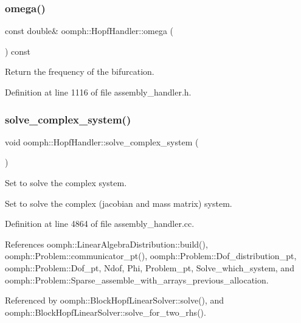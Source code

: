 \subsubsection{\texorpdfstring{omega()}{omega()}}
{\footnotesize\ttfamily const double\& oomph\+::\+Hopf\+Handler\+::omega (\begin{DoxyParamCaption}{ }\end{DoxyParamCaption}) const\hspace{0.3cm}{\ttfamily [inline]}}



Return the frequency of the bifurcation. 



Definition at line 1116 of file assembly\+\_\+handler.\+h.

\mbox{\label{classoomph_1_1HopfHandler_ac7feecfa644ae33b4a4a9fa8d1d993af}} 
\subsubsection{\texorpdfstring{solve\+\_\+complex\+\_\+system()}{solve\_complex\_system()}}
{\footnotesize\ttfamily void oomph\+::\+Hopf\+Handler\+::solve\+\_\+complex\+\_\+system (\begin{DoxyParamCaption}{ }\end{DoxyParamCaption})}



Set to solve the complex system. 

Set to solve the complex (jacobian and mass matrix) system. 

Definition at line 4864 of file assembly\+\_\+handler.\+cc.



References oomph\+::\+Linear\+Algebra\+Distribution\+::build(), oomph\+::\+Problem\+::communicator\+\_\+pt(), oomph\+::\+Problem\+::\+Dof\+\_\+distribution\+\_\+pt, oomph\+::\+Problem\+::\+Dof\+\_\+pt, Ndof, Phi, Problem\+\_\+pt, Solve\+\_\+which\+\_\+system, and oomph\+::\+Problem\+::\+Sparse\+\_\+assemble\+\_\+with\+\_\+arrays\+\_\+previous\+\_\+allocation.



Referenced by oomph\+::\+Block\+Hopf\+Linear\+Solver\+::solve(), and oomph\+::\+Block\+Hopf\+Linear\+Solver\+::solve\+\_\+for\+\_\+two\+\_\+rhs().

